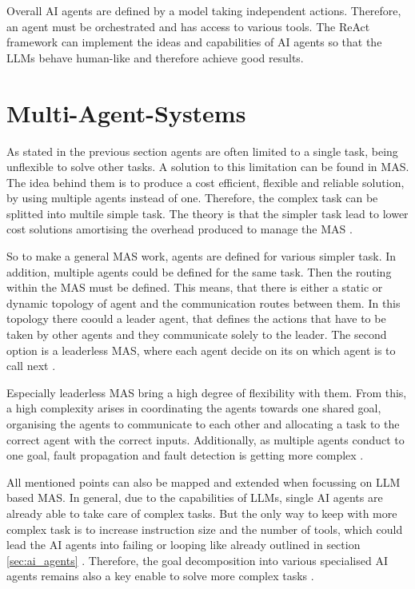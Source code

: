 \documentclass[a4paper,oneside,bibliography=totoc]{scrbook}
\begin{document}
Overall \ac{AI} agents are defined by a model taking independent actions. Therefore, an agent must be orchestrated and has access to various tools. The ReAct framework can implement the ideas and capabilities of \ac{AI} agents so that the \acp{LLM} behave human-like and therefore achieve good results.

\section{Multi-Agent-Systems}
\label{sec:multi_agent_systems}

As stated in the previous section agents are often limited to a single task, being unflexible to solve other tasks. A solution to this limitation can be found in \ac{MAS}. The idea behind them is to produce a cost efficient, flexible and reliable solution, by using multiple agents instead of one. Therefore, the complex task can be splitted into multile simple task. The theory is that the simpler task lead to lower cost solutions amortising the overhead produced to manage the \ac{MAS} \cite{Dorri2018}.

So to make a general \ac{MAS} work, agents are defined for various simpler task. In addition, multiple agents could be defined for the same task. Then the routing within the \ac{MAS} must be defined. This means, that there is either a static or dynamic topology of agent and the communication routes between them. In this topology there coould a leader agent, that defines the actions that have to be taken by other agents and they communicate solely to the leader. The second option is a leaderless \ac{MAS}, where each agent decide on its on which agent is to call next \cite{Dorri2018}.

Especially leaderless \ac{MAS} bring a high degree of flexibility with them. From this, a high complexity arises in coordinating the agents towards one shared goal, organising the agents to communicate to each other and allocating a task to the correct agent with the correct inputs. Additionally, as multiple agents conduct to one goal, fault propagation and fault detection is getting more complex \cite{Dorri2018}.

All mentioned points can also be mapped and extended when focussing on \ac{LLM} based \ac{MAS}. In general, due to the capabilities of \acp{LLM}, single \ac{AI} agents are already able to take care of complex tasks. But the only way to keep with more complex task is to increase instruction size and the number of tools, which could lead the \ac{AI} agents into failing or looping like already outlined in section \ref{sec:ai_agents} \cite{OpenAI2025}. Therefore, the goal decomposition into various specialised \ac{AI} agents remains also a key enable to solve more complex tasks \cite{Sapkota2025}.
\end{document}
